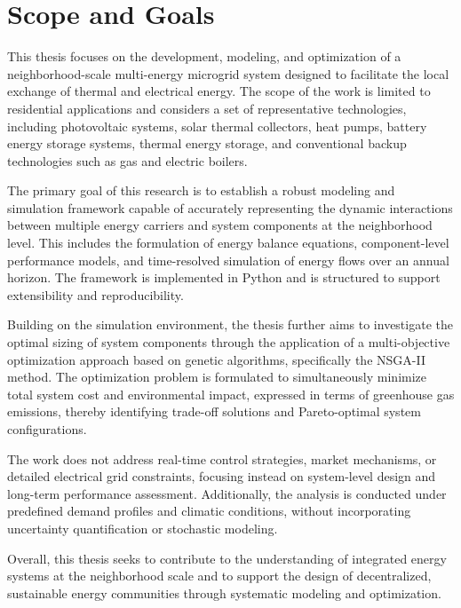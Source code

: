 \documentclass[12pt,a4paper]{report}
\begin{document}
\section{Scope and Goals}
This thesis focuses on the development, modeling, and optimization of a neighborhood-scale multi-energy microgrid system designed to facilitate the local exchange of thermal and electrical energy. The scope of the work is limited to residential applications and considers a set of representative technologies, including photovoltaic systems, solar thermal collectors, heat pumps, battery energy storage systems, thermal energy storage, and conventional backup technologies such as gas and electric boilers.

The primary goal of this research is to establish a robust modeling and simulation framework capable of accurately representing the dynamic interactions between multiple energy carriers and system components at the neighborhood level. This includes the formulation of energy balance equations, component-level performance models, and time-resolved simulation of energy flows over an annual horizon. The framework is implemented in Python and is structured to support extensibility and reproducibility.

Building on the simulation environment, the thesis further aims to investigate the optimal sizing of system components through the application of a multi-objective optimization approach based on genetic algorithms, specifically the NSGA-II method. The optimization problem is formulated to simultaneously minimize total system cost and environmental impact, expressed in terms of greenhouse gas emissions, thereby identifying trade-off solutions and Pareto-optimal system configurations.

The work does not address real-time control strategies, market mechanisms, or detailed electrical grid constraints, focusing instead on system-level design and long-term performance assessment. Additionally, the analysis is conducted under predefined demand profiles and climatic conditions, without incorporating uncertainty quantification or stochastic modeling.

Overall, this thesis seeks to contribute to the understanding of integrated energy systems at the neighborhood scale and to support the design of decentralized, sustainable energy communities through systematic modeling and optimization.
\end{document}

